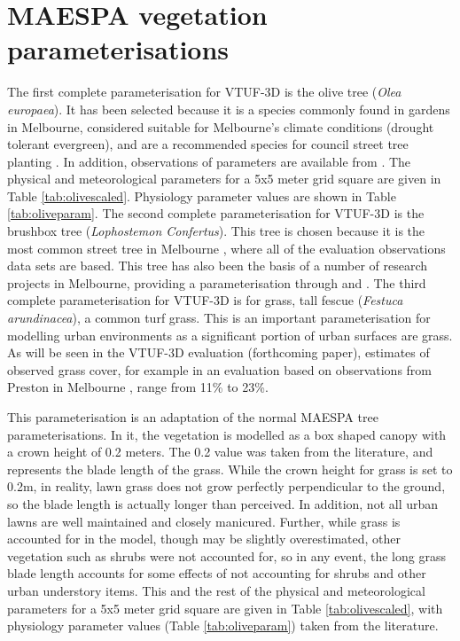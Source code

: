 \documentclass[final,3p,times,authoryear]{elsarticle}
\begin{document}
\section{MAESPA vegetation parameterisations}\label{sec:maespavegpara}  
%

The first complete parameterisation for VTUF-3D is the olive tree (\textit{Olea europaea}). It has been selected because it is a species commonly found in gardens in Melbourne, considered suitable for Melbourne's climate conditions (drought tolerant evergreen), and are a recommended species for council street tree planting \citep{PortPhillip2010}. In addition, observations of parameters are available from \cite{Coutts2014a}. The physical and meteorological parameters for a 5x5 meter grid square are given in Table \ref{tab:olivescaled}. Physiology parameter values are shown in Table \ref{tab:oliveparam}. The second complete parameterisation for VTUF-3D is the  brushbox tree (\textit{Lophostemon Confertus}). This tree is chosen because it is the most common street tree in Melbourne \citep{Frank2006}, where all of the evaluation observations data sets are based. This tree has also been the basis of a number of research projects in Melbourne, providing a parameterisation through \cite{Coutts2016} and \cite{Coutts2015ICUC}. The third complete parameterisation for VTUF-3D is for grass, tall fescue (\textit{Festuca arundinacea}), a common turf grass. This is an important parameterisation for modelling urban environments as a significant portion of urban surfaces are grass. As will be seen in the VTUF-3D evaluation (forthcoming paper), estimates of observed grass cover, for example in an evaluation based on observations from Preston in Melbourne \citep{Coutts2007,Nury2015}, range from 11\% to 23\%. 

This parameterisation is an adaptation of the normal MAESPA tree parameterisations. In it, the vegetation is modelled as a box shaped canopy with a crown height of 0.2 meters. The 0.2 value was taken from the literature, and represents the blade length of the grass. While the crown height for grass is set to 0.2m, in reality, lawn grass does not grow perfectly perpendicular to the ground, so the blade length is actually longer than perceived. In addition, not all urban lawns are well maintained and closely manicured. Further, while grass is accounted for in the model, though may be slightly overestimated, other vegetation such as shrubs were not accounted for, so in any event, the long grass blade length accounts for some effects of not accounting for shrubs and other urban understory items. This and the rest of the physical and meteorological parameters for a 5x5 meter grid square are given in Table \ref{tab:olivescaled}, with physiology parameter values (Table \ref{tab:oliveparam}) taken from the literature.
\end{document}
